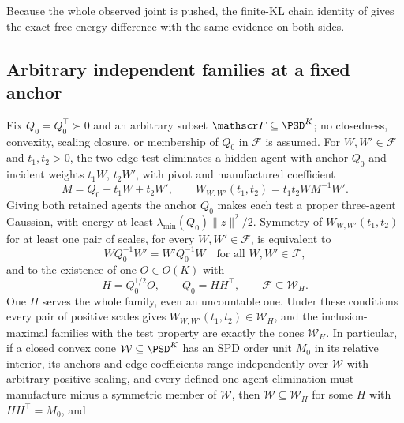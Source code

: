 Because the whole observed joint is pushed, the finite-KL chain identity of
 gives the exact free-energy difference with the same
evidence on both sides.

\subsection{Arbitrary independent families at a fixed anchor}
\label{sec:cg-independent-kron-families}

Fix \(Q_0=Q_0^\top\succ0\) and an arbitrary subset
\(\mathscr F\subseteq\PSD^K\); no closedness, convexity, scaling closure, or
membership of \(Q_0\) in \(\mathscr F\) is assumed. For
\(W,W'\in\mathscr F\) and \(t_1,t_2>0\), the two-edge test eliminates a hidden
agent with anchor \(Q_0\) and incident weights \(t_1W\), \(t_2W'\), with pivot
and manufactured coefficient
\begin{equation}
M=Q_0+t_1W+t_2W',\qquad
W_{W,W'}(t_1,t_2)=t_1t_2WM^{-1}W'.
\label{eq:cg-independent-pair-test}
\end{equation}
Giving both retained agents the anchor \(Q_0\) makes each test a proper
three-agent Gaussian, with energy at least \(\lambda_{\min}(Q_0)\|z\|^2/2\).
Symmetry of \(W_{W,W'}(t_1,t_2)\) for at least one pair of scales, for every
\(W,W'\in\mathscr F\), is equivalent to
\begin{equation}
WQ_0^{-1}W'=W'Q_0^{-1}W
\quad\text{for all }W,W'\in\mathscr F,
\label{eq:cg-anchor-commutation}
\end{equation}
and to the existence of one \(O\in O(K)\) with
\begin{equation}
H=Q_0^{1/2}O,\qquad Q_0=HH^\top,\qquad
\mathscr F\subseteq\mathcal W_H .
\label{eq:cg-anchored-common-cone}
\end{equation}
One \(H\) serves the whole family, even an uncountable one. Under these
conditions every pair of positive scales gives
\(W_{W,W'}(t_1,t_2)\in\mathcal W_H\), and the inclusion-maximal families with
the test property are exactly the cones \(\mathcal W_H\). In particular, if a
closed convex cone \(\mathcal W\subseteq\PSD^K\) has an SPD order unit \(M_0\)
in its relative interior, its anchors and edge coefficients range independently
over \(\mathcal W\) with arbitrary positive scaling, and every defined one-agent
elimination must manufacture minus a symmetric member of \(\mathcal W\), then
\(\mathcal W\subseteq\mathcal W_H\) for some \(H\) with \(HH^\top=M_0\), and
